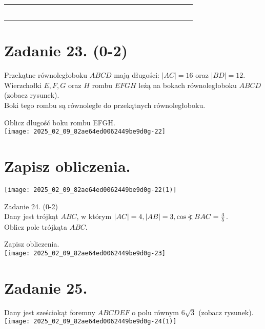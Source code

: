 \documentclass[10pt]{article}
\newcommand\Varangle{\mathop{{<\!\!\!\!\!\text{\small)}}\:}\nolimits}
\begin{document}
\begin{center}
\begin{tabular}{|c|c|c|c|c|c|c|c|c|c|c|c|c|c|c|c|c|c|c|c|c|c|c|}
\hline
 &  &  &  &  &  &  &  &  &  &  &  &  &  &  &  &  &  &  &  &  &  &  \\
\hline
 &  &  &  &  &  &  &  &  &  &  &  &  &  &  &  &  &  &  &  &  &  &  \\
\hline
 &  &  &  &  &  &  &  &  &  &  &  &  &  &  &  &  &  &  &  &  &  &  \\
\hline
 &  &  &  &  &  &  &  &  &  &  &  &  &  &  &  &  &  &  &  &  &  &  \\
\hline
 &  &  &  &  &  &  &  &  &  &  &  &  &  &  &  &  &  &  &  &  &  &  \\
\hline
 &  &  &  &  &  &  &  &  &  &  &  &  &  &  &  &  &  &  &  &  &  &  \\
\hline
\end{tabular}
\end{center}

\section*{Zadanie 23. (0-2)}
Przekątne równoległoboku \(A B C D\) mają długości: \(|A C|=16\) oraz \(|B D|=12\).\\
Wierzchołki \(E, F, G\) oraz \(H\) rombu \(E F G H\) leżą na bokach równoległoboku \(A B C D\) (zobacz rysunek).\\
Boki tego rombu są równoległe do przekątnych równoległoboku.

Oblicz długość boku rombu EFGH.\\
\texttt{[image: 2025\_02\_09\_82ae64ed0062449be9d0g-22]}

\section*{Zapisz obliczenia.}
\begin{center}
\texttt{[image: 2025\_02\_09\_82ae64ed0062449be9d0g-22(1)]}
\end{center}

Zadanie 24. (0-2)\\
Dany jest trójkąt \(A B C\), w którym \(|A C|=4,|A B|=3, \cos \Varangle B A C=\frac{4}{5}\).\\
Oblicz pole trójkąta \(A B C\).

Zapisz obliczenia.\\
\texttt{[image: 2025\_02\_09\_82ae64ed0062449be9d0g-23]}

\section*{Zadanie 25.}
Dany jest sześciokąt foremny \(A B C D E F\) o polu równym \(6 \sqrt{3}\) (zobacz rysunek).\\
\texttt{[image: 2025\_02\_09\_82ae64ed0062449be9d0g-24(1)]}
\end{document}

